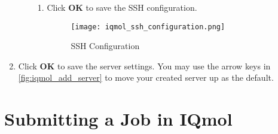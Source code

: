 \documentclass[12pt,letterpaper]{article}
\begin{document}
\begin{enumerate}
\begin{enumerate}
\begin{enumerate}
            \item Click \textbf{OK} to save the SSH configuration.

            \begin{figure}[H]
                \centering
                \texttt{[image: iqmol\_ssh\_configuration.png]}
                \caption{SSH Configuration}
                \label{fig:iqmol_ssh_configuration}
            \end{figure}
        \end{enumerate}
    \end{enumerate}

    \item Click \textbf{OK} to save the server settings. You may use the arrow keys in \cref{fig:iqmol_add_server} to move your created server up as the default.
\end{enumerate}
\newpage
\section{Submitting a Job in IQmol}
\end{document}
